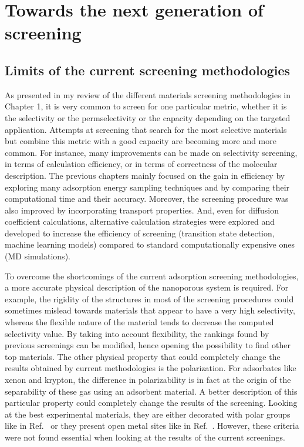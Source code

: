 \documentclass[main]{subfiles}
\begin{document}
\chapter{Towards the next generation of screening}
\vspace*{-1\baselineskip}

\section{Limits of the current screening methodologies}

As presented in my review of the different materials screening methodologies in Chapter 1, it is very common to screen for one particular metric, whether it is the selectivity or the permselectivity or the capacity depending on the targeted application. Attempts at screening that search for the most selective materials but combine this metric with a good capacity are becoming more and more common.\autocite{Chung_2019,Zhang_2022,Solanki_2020} For instance, many improvements can be made on selectivity screening, in terms of calculation efficiency, or in terms of correctness of the molecular description. The previous chapters mainly focused on the gain in efficiency by exploring many adsorption energy sampling techniques and by comparing their computational time and their accuracy. Moreover, the screening procedure was also improved by incorporating transport properties. And, even for diffusion coefficient calculations, alternative calculation strategies were explored and developed to increase the efficiency of screening (transition state detection, machine learning models) compared to standard computationally expensive ones (MD simulations).

To overcome the shortcomings of the current adsorption screening methodologies, a more accurate physical description of the nanoporous system is required. For example, the rigidity of the structures in most of the screening procedures could sometimes mislead towards materials that appear to have a very high selectivity, whereas the flexible nature of the material tends to decrease the computed selectivity value. By taking into account flexibility, the rankings found by previous screenings can be modified, hence opening the possibility to find other top materials. The other physical property that could completely change the results obtained by current methodologies is the polarization. For adsorbates like xenon and krypton, the difference in polarizability is in fact at the origin of the separability of these gas using an adsorbent material. A better description of this particular property could completely change the results of the screening. Looking at the best experimental materials, they are either decorated with polar groups like in Ref.~\cite{Li_2019} or they present open metal sites like in Ref.~\cite{Pei_2022}. However, these criteria were not found essential when looking at the results of the current screenings. 
\end{document}
